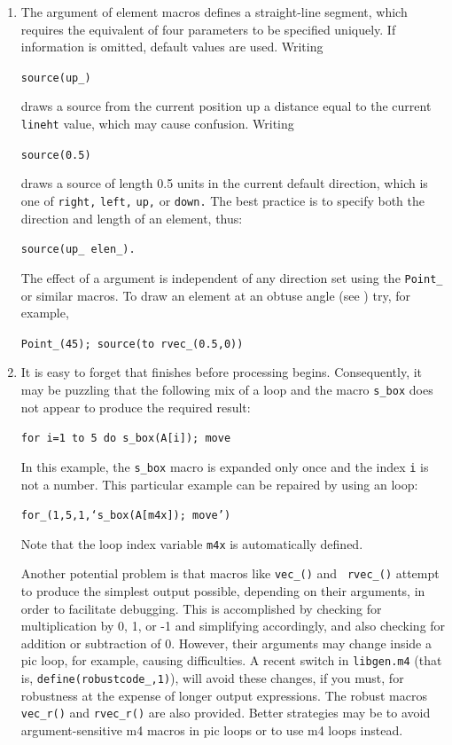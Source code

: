 \begin{enumerate}
\item 
{}
The \linespec argument of element
macros defines a straight-line segment, which requires
the equivalent of four parameters to be specified uniquely.
If information is omitted, default values are used.  Writing

{\tt source(up\_)}

\noindent draws a source from the current position up a distance equal
to the current {\tt lineht} value, which may cause confusion.
Writing

{\tt source(0.5)}

\noindent draws a source of length 0.5 units
in the current \pic default direction, which is one of
{\tt right,} {\tt left,} {\tt up,} or {\tt down.}
The best practice is
to specify both the direction and length of an element, thus:

{\tt source(up\_ elen\_).}

The effect of a \linespec argument is independent of any direction
set using the {\tt Point\_} or similar macros. 
To draw an element at an obtuse angle (see ) try,
for example,

{\tt Point\_(45); source(to rvec\_(0.5,0))}

\item 
It is easy to forget that \Mfour finishes before \pic processing
begins. Consequently, it may be puzzling that the following mix of
a \pic loop and the \Mfour macro {\tt s\_box} does not appear to produce
the required result:

{\tt for i=1 to 5 do \lbr s\_box(A[i]); move \rbr}

\noindent In this example, the {\tt s\_box} macro is expanded only once
and the index {\tt i} is not a number.  This particular example can be
repaired by using an \Mfour loop:

{\tt for\_(1,5,1,`s\_box(A[m4x]); move')}

Note that the loop index variable {\tt m4x} is automatically defined.

Another potential problem is that macros like {\tt vec\_()} and {\tt
rvec\_()} attempt to produce the simplest output possible, depending on
their arguments, in order to facilitate debugging.  This is accomplished
by checking for multiplication by 0, 1, or -1 and simplifying
accordingly, and also checking for addition or subtraction of 0.
However, their arguments may change inside a pic loop, for example,
causing difficulties.  A recent switch in {\tt libgen.m4} (that is,
{\tt define(\LQ{}robustcode\_\RQ,1)}), will avoid these changes, if
you must, for robustness at the expense of longer output expressions.
The robust macros {\tt vec\_r()} and {\tt rvec\_r()} are also provided.
Better strategies may be to avoid argument-sensitive m4 macros in pic
loops or to use m4 loops instead.


\end{enumerate}
